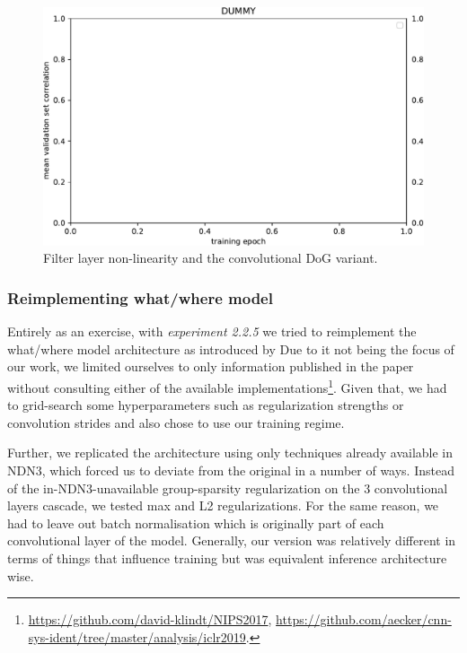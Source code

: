 \begin{figure}[H]
    \centering
    \includegraphics[width=1\textwidth]{../figures/05_dummy}
    \caption[Experiment 2.2.4]{Filter layer non-linearity and the convolutional DoG variant.}
    \label{fig:5.2.2.4}
\end{figure}

\subsubsection{Reimplementing what/where model}

Entirely as an exercise, with \textit{experiment 2.2.5} we tried to reimplement the what/\-where model architecture as introduced by \cite{klidnt} Due to it not being the focus of our work, we limited ourselves to only information published in the paper without consulting either of the available implementations\footnote{\href{https://github.com/david-klindt/NIPS2017}{https://github.com/david-klindt/NIPS2017}, \href{https://github.com/aecker/cnn-sys-ident/tree/master/analysis/iclr2019}{https://github.com/aecker/cnn-sys-ident/tree/master/analysis/iclr2019}.}. Given that, we had to grid-search some hyperparameters such as regularization strengths or convolution strides and also chose to use our training regime. 

Further, we replicated the architecture using only techniques already available in NDN3, which forced us to deviate from the original in a number of ways. Instead of the in-NDN3-unavailable group-sparsity regularization on the 3 convolutional layers cascade, we tested max and L2 regularizations. For the same reason, we had to leave out batch normalisation which is originally part of each convolutional layer of the model. Generally, our version was relatively different in terms of things that influence training but was equivalent inference architecture wise.

